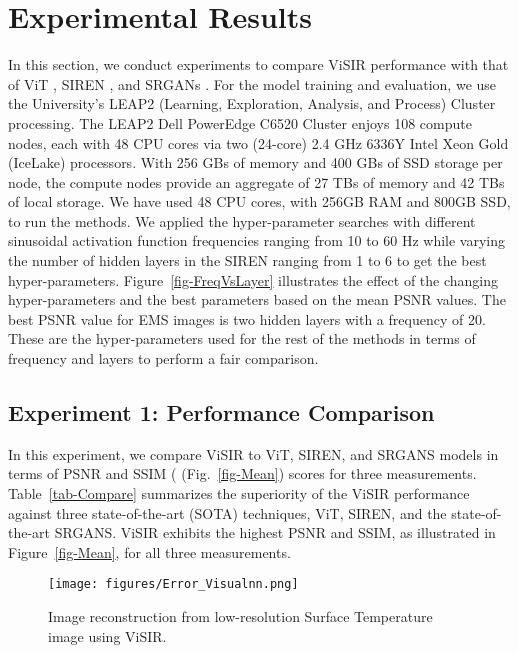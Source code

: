 \documentclass[pdflatex,sn-mathphys-num]{sn-jnl}%
\begin{document}
\section{Experimental Results}
\label{sec-Exp}

In this section, we conduct experiments to compare ViSIR performance with that of ViT \cite{Dosovitskiy2020}, SIREN \cite{SIREN}, and SRGANs \cite{ledig2017}. For the model training and evaluation, we use the University's LEAP2 (Learning, Exploration, Analysis, and Process) Cluster processing. The LEAP2 Dell PowerEdge C6520 Cluster enjoys 108 compute nodes, each with 48 CPU cores via two (24-core) 2.4 GHz 6336Y Intel Xeon Gold (IceLake) processors. With 256 GBs of memory and 400 GBs of SSD storage per node, the compute nodes provide an aggregate of 27 TBs of memory and 42 TBs of local storage. We have used 48 CPU cores, with 256GB RAM and 800GB SSD, to run the methods. We applied the hyper-parameter searches with different sinusoidal activation function frequencies ranging from 10 to 60 Hz while varying the number of hidden layers in the SIREN ranging from 1 to 6 to get the best hyper-parameters. Figure~\ref{fig-FreqVsLayer} illustrates the effect of the changing hyper-parameters and the best parameters based on the mean PSNR values. The best PSNR value for EMS images is two hidden layers with a frequency of 20. These are the hyper-parameters used for the rest of the methods in terms of frequency and layers to perform a fair comparison.

\subsection{Experiment 1: Performance Comparison} 
In this experiment, we compare ViSIR to ViT, SIREN, and SRGANS models in terms of PSNR and SSIM ( (Fig.~\ref{fig-Mean}) scores for three measurements. Table~\ref{tab-Compare} summarizes the superiority of the ViSIR performance against three state-of-the-art (SOTA) techniques, ViT, SIREN, and the state-of-the-art SRGANS. ViSIR exhibits the highest PSNR and SSIM, as illustrated in Figure~\ref{fig-Mean}, for all three measurements. 






\begin{figure}[!ht]
 \centering
 \texttt{[image: figures/Error\_Visualnn.png]} 
 \caption{Image reconstruction from low-resolution Surface Temperature image using ViSIR.}
 \label{fig-Visual}
\end{figure}
\end{document}
